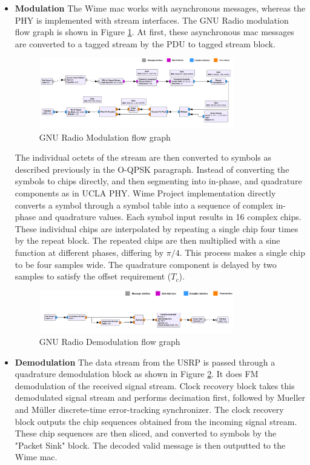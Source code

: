\begin{itemize}

\item{\textbf{Modulation} The Wime \ac{mac} works with asynchronous messages, whereas the \ac{PHY} is implemented with stream interfaces.
The GNU Radio modulation flow graph is shown in Figure \ref{TX flow graph}.
At first, these asynchronous \ac{mac} messages are converted to a tagged stream by the PDU to tagged stream block.
\begin{figure}[h!]
\centering
\includegraphics[width=0.8\textwidth]{Figure/TXPath.png}
\caption{GNU Radio Modulation flow graph}
\label{TX flow graph}
\end{figure}

The individual octets of the stream are then converted to symbols as described previously in the \ac{O-QPSK} paragraph.
Instead of converting the symbols to chips directly, and then segmenting into in-phase, and quadrature components as in UCLA PHY.
Wime Project implementation directly converts a symbol through a symbol table into a sequence of complex in-phase and quadrature values.
Each symbol input results in 16 complex chips.
These individual chips are interpolated by repeating a single chip four times by the repeat block.
The repeated chips are then multiplied with a sine function at different phases, differing by $\pi/4$.
This process makes a single chip to be four samples wide.
The quadrature component is delayed by two samples to satisfy the offset requirement ($T_c$).}

\begin{figure}[h!]
\centering
\includegraphics[width=0.8\textwidth]{Figure/RXPath.png}
\caption{GNU Radio Demodulation flow graph}
\label{RX flow graph}
\end{figure}


\item{\textbf{Demodulation} The data stream from the USRP is passed through a quadrature demodulation block as shown in Figure \ref{RX flow graph}.
It does FM demodulation of the received signal stream.
Clock recovery block takes this demodulated signal stream and performs  decimation first, followed by  Mueller and Müller discrete-time error-tracking synchronizer.
The clock recovery block outputs the chip sequences obtained from the incoming signal stream.
These chip sequences are then sliced, and converted to symbols by the "Packet Sink" block.
The decoded valid message is then outputted to the Wime \ac{mac}.}


\end{itemize}
